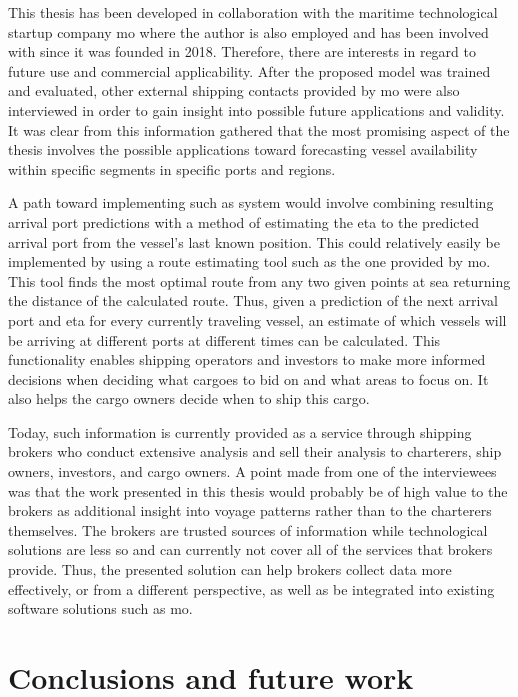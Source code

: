 This thesis has been developed in collaboration with the maritime technological startup company \acrfull{mo} where the author is also employed and has been involved with since it was founded in 2018. Therefore, there are interests in regard to future use and commercial applicability. After the proposed model was trained and evaluated, other external shipping contacts provided by \acrshort{mo} were also interviewed in order to gain insight into possible future applications and validity. It was clear from this information gathered that the most promising aspect of the thesis involves the possible applications toward forecasting vessel availability within specific segments in specific ports and regions.

A path toward implementing such as system would involve combining resulting arrival port predictions with a method of estimating the \acrfull{eta} to the predicted arrival port from the vessel's last known position. This could relatively easily be implemented by using a route estimating tool such as the one provided by \acrshort{mo}. This tool finds the most optimal route from any two given points at sea returning the distance of the calculated route. Thus, given a prediction of the next arrival port and \acrshort{eta} for every currently traveling vessel, an estimate of which vessels will be arriving at different ports at different times can be calculated. This functionality enables shipping operators and investors to make more informed decisions when deciding what cargoes to bid on and what areas to focus on. It also helps the cargo owners decide when to ship this cargo.

Today, such information is currently provided as a service through shipping brokers who conduct extensive analysis and sell their analysis to charterers, ship owners, investors, and cargo owners. A point made from one of the interviewees was that the work presented in this thesis would probably be of high value to the brokers as additional insight into voyage patterns rather than to the charterers themselves. The brokers are trusted sources of information while technological solutions are less so and can currently not cover all of the services that brokers provide. Thus, the presented solution can help brokers collect data more effectively, or from a different perspective, as well as be integrated into existing software solutions such as \acrshort{mo}.

\section{Conclusions and future work}

